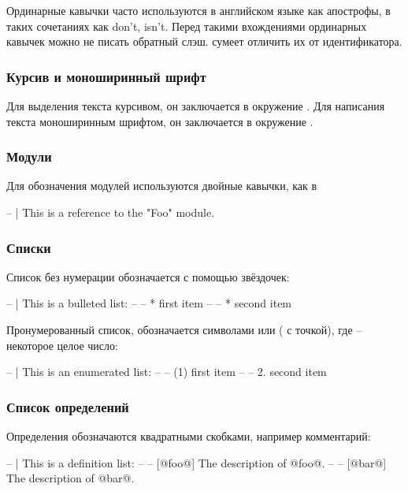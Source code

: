 Ординарные кавычки часто используются в английском языке как апострофы,
в таких сочетаниях как don't, isn't. Перед такими вхождениями ординарных
кавычек можно не писать обратный слэш.  сумеет отличить их
от идентификатора.

\subsubsection{Курсив и моноширинный шрифт}

Для выделения текста курсивом, он заключается в окружение . Для
написания текста моноширинным шрифтом, он заключается в окружение
.

\subsubsection{Модули}

Для обозначения модулей используются двойные кавычки, как в


\begin{code}
-- | This is a reference to the "Foo" module.
\end{code}

\subsubsection{Списки}

Список без нумерации обозначается с помощью звёздочек:


\begin{code}
-- | This is a bulleted list:
--
--     * first item
--
--     * second item
\end{code}

Пронумерованный список, обозначается символами  или 
( с точкой), где  -- некоторое целое число:


\begin{code}
-- | This is an enumerated list:
--
--     (1) first item
--
--     2. second item
\end{code}

\subsubsection{Список определений}

Определения обозначаются квадратными скобками, например комментарий:


\begin{code}
-- | This is a definition list:
--
--   [@foo@] The description of @foo@.
--
--   [@bar@] The description of @bar@.
\end{code}

